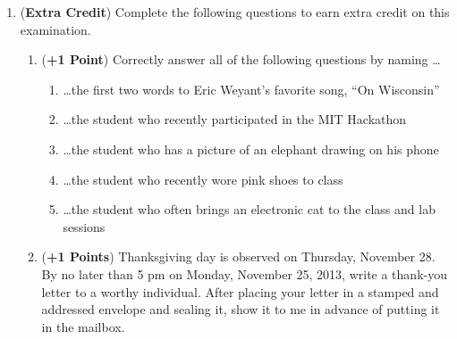 \documentclass[12pt,epsf,psfig,graphicx]{article}
\begin{document}
\begin{enumerate}
\newpage

\item ({\bf Extra Credit}) Complete the following questions to earn extra credit on this examination.

	\begin{enumerate}

		\item ({\bf +1 Point}) Correctly answer all of the following questions by naming \ldots

		\begin{enumerate}
			\item \ldots the first two words to Eric Weyant's favorite song, ``On Wisconsin''
			\item \ldots the student who recently participated in the MIT Hackathon
			\item \ldots the student who has a picture of an elephant drawing on his phone
			\item \ldots the student who recently wore pink shoes to class
			\item \ldots the student who often brings an electronic cat to the class and lab sessions
		\end{enumerate}
	
	\item ({\bf +1 Points}) Thanksgiving day is observed on Thursday, November 28.  By no later than 5 pm on Monday,
		November 25, 2013, write a thank-you letter to a worthy individual.  After placing your letter in a stamped and
		addressed envelope and sealing it, show it to me in advance of putting it in the mailbox.

\end{enumerate}

\end{enumerate}
\end{document}
